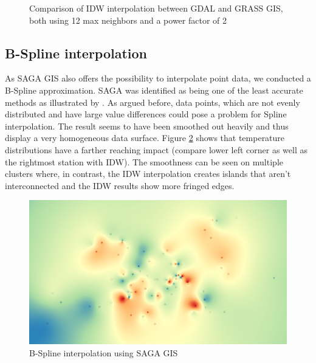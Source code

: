 \begin{figure}
	\centering
	\hfill
	\caption[Comparison of IDW interpolation between GDAL and GRASS GIS]{Comparison of IDW interpolation between GDAL and GRASS GIS, both using 12 max neighbors and a power factor of 2}
	\label{fig:result_idw_gdal_grass}
\end{figure}

\subsection{B-Spline interpolation}

As SAGA GIS also offers the possibility to interpolate point data, we conducted a B-Spline approximation. SAGA was identified as being one of the least accurate methods as illustrated by \citeauthor{wenjing_cao_study_2009}. As argued before, data points, which are not evenly distributed and have large value differences could pose a problem for Spline interpolation. The result seems to have been \ldq{}smoothed\rdq{} out heavily and thus display a very homogeneous data surface. Figure \ref{fig:result_bspline} shows that temperature distributions have a farther reaching impact (compare lower left corner as well as the rightmost station with IDW). The smoothness can be seen on multiple clusters where, in contrast, the IDW interpolation creates islands that aren't interconnected and the IDW results show more fringed edges.

\begin{figure}[H]
	\centering
	\includegraphics[width=.7\linewidth]{comparison/compare_bspline_saga.png}
	\caption{B-Spline interpolation using SAGA GIS}
	\label{fig:result_bspline}
\end{figure}
